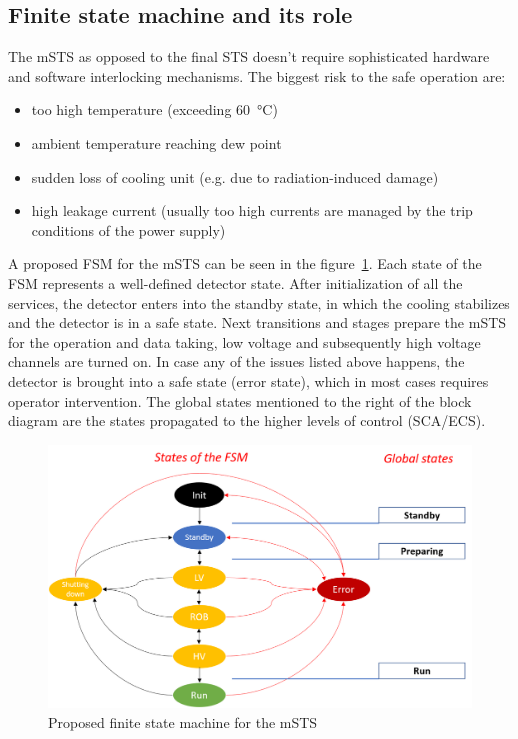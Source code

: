 \subsection{Finite state machine and its role}
The \gls{mSTS} as opposed to the final \gls{STS} doesn't require sophisticated hardware and software interlocking mechanisms. The biggest risk to the safe operation are:
\begin{itemize}
    \item too high temperature (exceeding \SI{60}{\degreeCelsius})
    \item ambient temperature reaching dew point 
    \item sudden loss of cooling unit (e.g. due to radiation-induced damage)
    \item high leakage current (usually too high currents are managed by the trip conditions of the power supply)
\end{itemize}
A proposed \gls{FSM} for the \gls{mSTS} can be seen in the figure~\ref{fig_FSM}. Each state of the \gls{FSM} represents a well-defined detector state. After initialization of all the services, the detector enters into the standby state, in which the cooling stabilizes and the detector is in a safe state. Next transitions and stages prepare the \gls{mSTS} for the operation and data taking, low voltage and subsequently high voltage channels are turned on. In case any of the issues listed above happens, the detector is brought into a safe state (error state), which in most cases requires operator intervention. The global states mentioned to the right of the block diagram are the states propagated to the higher levels of control (\gls{SCA}/\gls{ECS}).
\begin{figure}[h!]
\centering
\includegraphics[width=1\columnwidth]{Chapter6/DCS/images/FSM.png}
\caption{Proposed finite state machine for the \gls{mSTS}}
\label{fig_FSM}
\end{figure}

